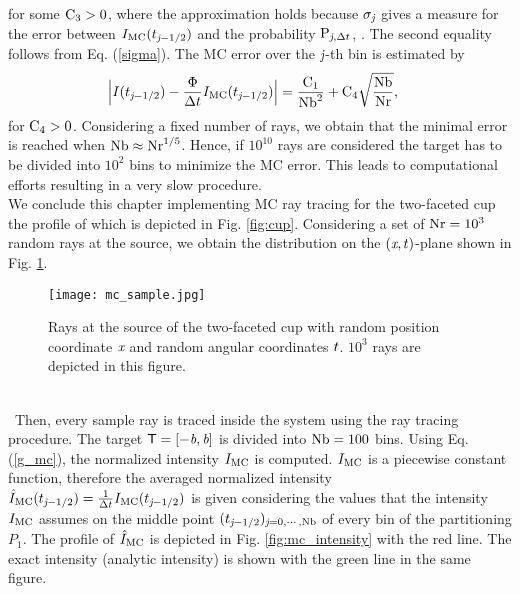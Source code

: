 for some $\textrm{C}_3>0$, where the approximation holds because $\sigma_{\textit{j}}$ gives a measure for the error between
$I_{\textrm{MC}}(t_{\textit{j}-1/2})$ and the probability $\textrm{P}_{\textit{j}, \Delta t}$, \cite{diez2012openintro}. The second equality follows from Eq. (\ref{sigma}). The MC error over the $\textit{j}$-th bin is estimated by
\begin{equation} \begin{aligned}
\Big|I(t_{\textit{j}-1/2})&-\frac{\Phi}
{\Delta t}I_{\textrm{MC}}(t_{\textit{j}-1/2})\Big| =
\frac{\textrm{C}_1}{\textrm{Nb}^2} + \textrm{C}_4\sqrt{\frac{\textrm{Nb}}{\textrm{Nr}}},
\end{aligned}
\end{equation}
for $\textrm{C}_4>0$.
Considering a fixed number of rays, we obtain that the minimal error is reached when $\textrm{Nb}\approx \textrm{Nr}^{1/5}$.
Hence, if $10^{10}$ rays are considered the target has to be divided into $10^2$ bins to minimize the MC error.
This leads to computational efforts resulting in a very slow procedure.\\ \indent
We conclude this chapter implementing MC ray tracing for the two-faceted cup the profile of which is depicted in Fig. \ref{fig:cup}. 
Considering a set of $\textrm{Nr} = 10^3$ random rays 
at the source, we obtain the distribution on the $(\textit{x}, t)$-plane shown in Fig. \ref{fig:mc_sample}.
\begin{figure}[h]
\begin{center}
    \texttt{[image: mc\_sample.jpg]}
    \caption{Rays at the source of the two-faceted cup with random position coordinate $\textit{x}$ and random angular coordinates $t$. $10^3$ rays are depicted in this figure.}
    \label{fig:mc_sample}
\end{center}
  \end{figure}
\\\ Then, every sample ray is traced inside the system using the ray tracing procedure. 
The target $\textsf{T} = [-\textit{b}, \textit{b}]$ is divided into $\textrm{Nb}= 100$ bins.
Using Eq. (\ref{g_mc}), the normalized intensity $I_{\textrm{MC}}$ is computed. $I_{\textrm{MC}}$  is a piecewise constant function, therefore the averaged normalized intensity  $\hat{I}_{\textrm{MC}}(t_{\textit{j}-1/2})= \frac{1}{\Delta t}I_{\textrm{MC}}(t_{\textit{j}-1/2})$ is given considering the values that the intensity $I_{\textrm{MC}}$ assumes on the middle point $(t_{\textit{j}-1/2})_{\textit{j} = 0, \cdots, \textrm{Nb}}$ of every bin of the partitioning $P_1$. The profile of $\hat{I}_{\textrm{MC}}$ is depicted in Fig. \ref{fig:mc_intensity} with the red line. The exact intensity (analytic intensity) is shown with the green line in the same figure.
